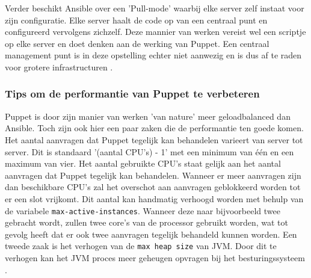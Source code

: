   Verder beschikt Ansible over een 'Pull-mode' waarbij elke server zelf instaat voor zijn configuratie. Elke server haalt de code op van een centraal punt en configureerd vervolgens zichzelf. Deze mannier van werken vereist wel een scriptje op elke server en doet denken aan de werking van Puppet. Een centraal management punt is in deze opstelling echter niet aanwezig en is dus af te raden voor grotere infrastructuren \autocite{AnsibleTuning} .
  
 \subsubsection{Tips om de performantie van Puppet te verbeteren}
 Puppet is door zijn manier van werken 'van nature' meer geloadbalanced dan Ansible. Toch zijn ook hier een paar zaken die de performantie ten goede komen. Het aantal aanvragen dat Puppet tegelijk kan behandelen varieert van server tot server. Dit is standaard '(aantal CPU's) - 1' met een minimum van \'e\'en en een maximum van vier. Het aantal gebruikte CPU's staat gelijk aan het aantal aanvragen dat Puppet tegelijk kan behandelen. Wanneer er meer aanvragen zijn dan beschikbare CPU's zal het overschot aan aanvragen geblokkeerd worden tot er een slot vrijkomt. Dit aantal kan handmatig verhoogd worden met behulp van de variabele \texttt{max-active-instances}. Wanneer deze naar bijvoorbeeld twee gebracht wordt, zullen twee core's van de processor gebruikt worden, wat tot gevolg heeft dat er ook twee aanvragen tegelijk behandeld kunnen worden. \newline
 Een tweede zaak is het verhogen van de \texttt{max heap size} van JVM. Door dit te verhogen kan het JVM proces meer geheugen opvragen bij het besturingssysteem \autocite{PuppetTuning}.
 
 
